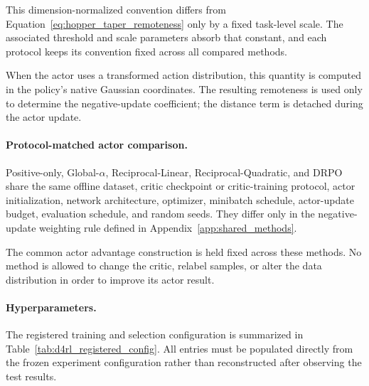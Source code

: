 This dimension-normalized convention differs from
Equation~\eqref{eq:hopper_taper_remoteness} only by a fixed task-level scale.
The associated threshold and scale parameters absorb that constant, and each
protocol keeps its convention fixed across all compared methods.

When the actor uses a transformed action distribution, this quantity is
computed in the policy's native Gaussian coordinates. The resulting
remoteness is used only to determine the negative-update coefficient;
the distance term is detached during the actor update.

\paragraph{Protocol-matched actor comparison.}

Positive-only, Global-\(\alpha\), Reciprocal-Linear,
Reciprocal-Quadratic, and DRPO share the same offline dataset, critic
checkpoint or critic-training protocol, actor initialization, network
architecture, optimizer, minibatch schedule, actor-update budget,
evaluation schedule, and random seeds. They differ only in the
negative-update weighting rule defined in
Appendix~\ref{app:shared_methods}.

The common actor advantage construction is held fixed across these
methods. No method is allowed to change the critic, relabel samples, or
alter the data distribution in order to improve its actor result.

\paragraph{Hyperparameters.}

The registered training and selection configuration is summarized in
Table~\ref{tab:d4rl_registered_config}. All entries must be populated
directly from the frozen experiment configuration rather than
reconstructed after observing the test results.

